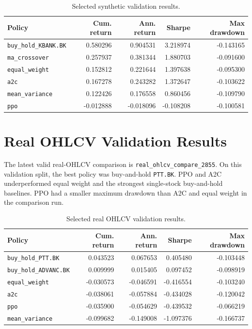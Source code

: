 \documentclass[11pt]{article}
\begin{document}
\begin{table}[h]
\centering
\caption{Selected synthetic validation results.}
\label{tab:synthetic-results}
\begin{tabular}{lrrrr}
\toprule
Policy & Cum. return & Ann. return & Sharpe & Max drawdown \\
\midrule
\texttt{buy\_hold\_KBANK.BK} & 0.580296 & 0.904531 & 3.218974 & -0.143165 \\
\texttt{ma\_crossover} & 0.257937 & 0.381344 & 1.880703 & -0.091600 \\
\texttt{equal\_weight} & 0.152812 & 0.221644 & 1.397638 & -0.095300 \\
\texttt{a2c} & 0.167278 & 0.243282 & 1.372647 & -0.103622 \\
\texttt{mean\_variance} & 0.122426 & 0.176558 & 0.860456 & -0.109790 \\
\texttt{ppo} & -0.012888 & -0.018096 & -0.108208 & -0.100581 \\
\bottomrule
\end{tabular}
\end{table}

\section{Real OHLCV Validation Results}
The latest valid real-OHLCV comparison is \texttt{real\_ohlcv\_compare\_2855}. On this validation split, the best policy was buy-and-hold \texttt{PTT.BK}. PPO and A2C underperformed equal weight and the strongest single-stock buy-and-hold baselines. PPO had a smaller maximum drawdown than A2C and equal weight in the comparison run.

\begin{table}[h]
\centering
\caption{Selected real OHLCV validation results.}
\label{tab:real-results}
\begin{tabular}{lrrrr}
\toprule
Policy & Cum. return & Ann. return & Sharpe & Max drawdown \\
\midrule
\texttt{buy\_hold\_PTT.BK} & 0.043523 & 0.067653 & 0.405480 & -0.103448 \\
\texttt{buy\_hold\_ADVANC.BK} & 0.009999 & 0.015405 & 0.097452 & -0.098919 \\
\texttt{equal\_weight} & -0.030573 & -0.046591 & -0.416554 & -0.103240 \\
\texttt{a2c} & -0.038061 & -0.057884 & -0.434028 & -0.120042 \\
\texttt{ppo} & -0.035900 & -0.054629 & -0.439532 & -0.066219 \\
\texttt{mean\_variance} & -0.099682 & -0.149008 & -1.097376 & -0.166737 \\
\bottomrule
\end{tabular}
\end{table}
\end{document}
